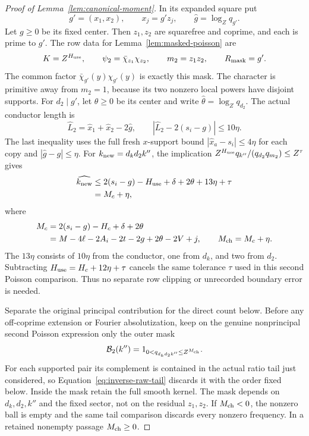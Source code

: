\documentclass[11pt,a4paper]{article}
\numberwithin{equation}{section}
\numberwithin{figure}{section}
\theoremstyle{definition}
\theoremstyle{remark}
\begin{document}
\begin{proof}[Proof of Lemma~\ref{lem:canonical-moment}]
In its expanded square put
\[
 g'=(x_1,x_2),\qquad x_j=g'z_j,\qquad
 \widehat g=\log_Zq_{g'}.
\]
Let \(g\ge0\) be its fixed center.
Then \(z_1,z_2\) are squarefree and coprime, and each is prime to
\(g'\).  The row data for Lemma~\ref{lem:masked-poisson} are
\begin{equation}\label{eq:second-masked-data}
 K=Z^{H_{\rm use}},\qquad
 \psi_2=\bar\chi_{z_1}\chi_{z_2},\qquad
 m_2=z_1z_2,\qquad R_{\rm mask}=g'.
\end{equation}
The common factor \(\bar\chi_{g'}(y)\chi_{g'}(y)\) is exactly this
mask.  The character is primitive away from \(m_2=1\), because its
two nonzero local powers have disjoint supports.  For \(d_2\mid g'\),
let \(\theta\ge0\) be its center and write
\(\widehat\theta=\log_Zq_{d_2}\).  The actual conductor length is
\[
 \widehat L_2=\widehat x_1+\widehat x_2-2\widehat g,
 \qquad |\widehat L_2-2(s_i-g)|\le10\eta.
\]
The last inequality uses the full fresh \(x\)-support bound
\(|\widehat x_a-s_i|\le4\eta\) for each copy and
\(|\widehat g-g|\le\eta\).  For \(k_{\rm new}=d_kd_2k''\), the implication
\(Z^{H_{\rm use}}q_{k''}/(q_{d_2}q_{m_2})\le Z^\tau\) gives
\[
 \begin{split}
 \widehat{k_{\rm new}}
 &\le2(s_i-g)-H_{\rm use}+\delta+2\theta+13\eta+\tau\\
 &=M_c+\eta,
 \end{split}
\]
where
\begin{equation}\label{eq:second-poisson-lengths}
 \begin{split}
 M_c&=2(s_i-g)-H_c+\delta+2\theta\\
    &=M-4\ell-2A_i-2t-2g+2\theta-2V+j,\qquad
 M_{\rm ch}=M_c+\eta.
 \end{split}
\end{equation}
The \(13\eta\) consists of \(10\eta\) from the conductor, one from
\(d_k\), and two from \(d_2\).  Subtracting
\(H_{\rm use}=H_c+12\eta+\tau\) cancels the same tolerance \(\tau\)
used in this second Poisson comparison.  Thus no separate row clipping
or unrecorded boundary error is needed.

Separate the original principal contribution for the direct count below.
Before any off-coprime extension or Fourier absolutization, keep on the
genuine nonprincipal second Poisson expression only the outer mask
\[
 \mathcal B_2(k'')=1_{0<q_{d_kd_2k''}\le Z^{M_{\rm ch}}}.
\]
For each supported pair its complement is contained in the actual ratio
tail just considered, so Equation~\eqref{eq:inverse-raw-tail} discards it
with the order fixed below.  Inside the mask retain the full smooth kernel.
The mask depends on \(d_k,d_2,k''\) and the fixed sector, not on the residual
\(z_1,z_2\).  If \(M_{\rm ch}<0\), the nonzero ball is empty and the same
tail comparison discards every nonzero frequency.  In a retained nonempty
passage \(M_{\rm ch}\ge0\).


\end{proof}
\end{document}

